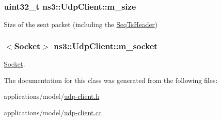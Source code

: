 \subsubsection[{\texorpdfstring{m\+\_\+size}{m_size}}]{\setlength{\rightskip}{0pt plus 5cm}uint32\+\_\+t ns3\+::\+Udp\+Client\+::m\+\_\+size\hspace{0.3cm}{\ttfamily [private]}}\hypertarget{classns3_1_1UdpClient_aa3adbd7e4fc1590d0b99c225a083abb9}{}\label{classns3_1_1UdpClient_aa3adbd7e4fc1590d0b99c225a083abb9}


Size of the sent packet (including the \hyperlink{classns3_1_1SeqTsHeader}{Seq\+Ts\+Header}) 

\subsubsection[{\texorpdfstring{m\+\_\+socket}{m_socket}}]{$<${\bf Socket}$>$ ns3\+::\+Udp\+Client\+::m\+\_\+socket\hspace{0.3cm}{\ttfamily [private]}}\hypertarget{classns3_1_1UdpClient_a3cdc972a2847e5f79738e1880e96bb0b}{}\label{classns3_1_1UdpClient_a3cdc972a2847e5f79738e1880e96bb0b}


\hyperlink{classns3_1_1Socket}{Socket}. 



The documentation for this class was generated from the following files\+:\begin{DoxyCompactItemize}
\item 
applications/model/\hyperlink{udp-client_8h}{udp-\/client.\+h}\item 
applications/model/\hyperlink{udp-client_8cc}{udp-\/client.\+cc}\end{DoxyCompactItemize}
